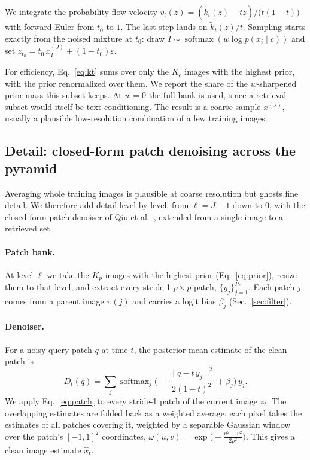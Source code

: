 We integrate the probability-flow velocity $v_t(z)=(\tilde k_t(z)-t z)/\big(t(1-t)\big)$ with forward Euler from $t_0$ to $1$. The last step lands on $\tilde k_t(z)/t$. Sampling starts exactly from the noised mixture at $t_0$: draw $I\sim\operatorname{softmax}(w\log p(x_i\mid c))$ and set $z_{t_0}=t_0\,x_I^{(J)}+(1-t_0)\varepsilon$.

For efficiency, Eq.~\eqref{eq:kt} sums over only the $K_c$ images with the highest prior, with the prior renormalized over them. We report the share of the $w$-sharpened prior mass this subset keeps. At $w=0$ the full bank is used, since a retrieval subset would itself be text conditioning. The result is a coarse sample $x^{(J)}$, usually a plausible low-resolution combination of a few training images.

\subsection{Detail: closed-form patch denoising across the pyramid}
\label{sec:pyramid}

Averaging whole training images is plausible at coarse resolution but ghosts fine detail. We therefore add detail level by level, from $\ell=J-1$ down to $0$, with the closed-form patch denoiser of Qiu et al.~\cite{qiu2025efficient}, extended from a single image to a retrieved set.

\paragraph{Patch bank.}
At level $\ell$ we take the $K_p$ images with the highest prior (Eq.~\eqref{eq:prior}), resize them to that level, and extract every stride-1 $p\times p$ patch, $\{y_j\}_{j=1}^{P_\ell}$. Each patch $j$ comes from a parent image $\pi(j)$ and carries a logit bias $\beta_j$ (Sec.~\ref{sec:filter}).

\paragraph{Denoiser.}
For a noisy query patch $q$ at time $t$, the posterior-mean estimate of the clean patch is
\begin{equation}
  D_t(q) = \sum_j \operatorname{softmax}_j\!\Big(-\frac{\lVert q-t\,y_j\rVert^2}{2(1-t)^2} + \beta_j\Big)\, y_j .
  \label{eq:patch}
\end{equation}
We apply Eq.~\eqref{eq:patch} to every stride-1 patch of the current image $z_t$. The overlapping estimates are folded back as a weighted average: each pixel takes the estimates of all patches covering it, weighted by a separable Gaussian window over the patch's $[-1,1]^2$ coordinates, $\omega(u,v)=\exp\!\big(-\tfrac{u^2+v^2}{2\rho^2}\big)$. This gives a clean image estimate $\hat x_t$.

